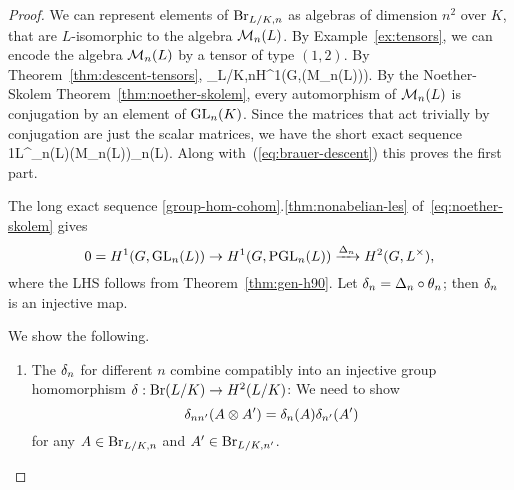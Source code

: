 \begin{proof}
We can represent elements of $\Br_{L/K,n}$ as algebras of dimension $n^2$ over $K$, that are $L$-isomorphic to the algebra $\cal M_n(L)$. By Example~\ref{ex:tensors}, we can encode the algebra $\cal M_n(L)$ by a tensor of type $(1,2)$. By Theorem~\ref{thm:descent-tensors},
\Br_{L/K,n}\cong H^1(G,\Aut(\cal M_n(L))).
\eeq
By the Noether-Skolem Theorem~\ref{thm:noether-skolem}, every automorphism of $\cal M_n(L)$ is conjugation by an element of $\GL_n(K)$. Since the matrices that act trivially by conjugation are just the scalar matrices, we have the short exact sequence
1\to L^{\times}\to \GL_n(L)\to \Aut(\cal M_n(L))\cong \PGL_n(L).
\eeq
Along with~(\ref{eq:brauer-descent}) this proves the first part.

The long exact sequence \ref{group-hom-cohom}.\ref{thm:nonabelian-les} of~\eqref{eq:noether-skolem} gives 
\[
0=H^1(G,\GL_n(L))\to H^1(G,\PGL_n(L))\xra{\De_n} H^2(G,L^{\times}),
\]
where the LHS follows from Theorem~\ref{thm:gen-h90}. Let $\de_n=\De_n\circ \te_n$; then $\de_n$ is an injective map.

We show the following.
\begin{enumerate}
\item The $\de_n$ for different $n$ combine compatibly into an injective group homomorphism $\de:\Br(L/K)\to H^2(L/K)$: 
We need to show
\[
\de_{nn'}(A\ot A')=\de_n(A)\de_{n'}(A')
\]
for any $A\in \Br_{L/K,n}$ and $A'\in \Br_{L/K,n'}$.


\end{enumerate}
\end{proof}
